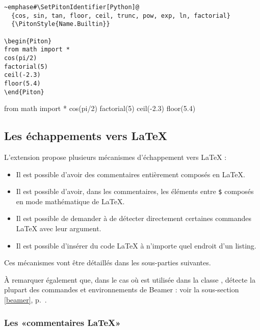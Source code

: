 \documentclass[dvipsnames,svgnames]{article}
\begin{document}
\begin{Verbatim}
~emphase#\SetPitonIdentifier[Python]@
  {cos, sin, tan, floor, ceil, trunc, pow, exp, ln, factorial}
  {\PitonStyle{Name.Builtin}}

\begin{Piton}
from math import *
cos(pi/2) 
factorial(5)
ceil(-2.3) 
floor(5.4) 
\end{Piton}
\end{Verbatim}

\begingroup

  {}
 
\begin{Piton}
from math import *
cos(pi/2) 
factorial(5)
ceil(-2.3) 
floor(5.4) 
\end{Piton}


\endgroup



\subsection{Les échappements vers LaTeX}

\label{LaTeX-escapes}

L'extension  propose plusieurs mécanismes d'échappement vers LaTeX :
\begin{itemize}
\item Il est possible d'avoir des commentaires entièrement composés en LaTeX.
\item Il est possible d'avoir, dans les commentaires, les éléments entre
\texttt{\$} composés en mode mathématique de LaTeX.
\item Il est possible de demander à  de détecter directement certaines
commandes LaTeX avec leur argument.
\item Il est possible d'insérer du code LaTeX à n'importe quel endroit d'un listing.
\end{itemize}
Ces mécanismes vont être détaillés dans les sous-parties suivantes.

\smallskip
À remarquer également que, dans le cas où  est utilisée dans la classe
,  détecte la plupart des commandes et environnements de Beamer :
voir la sous-section \ref{beamer}, p.~\pageref{beamer}.



\subsubsection{Les «commentaires LaTeX»}
\end{document}
